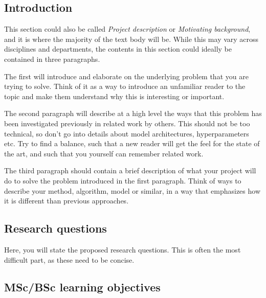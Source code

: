 \documentclass{article}
\begin{document}
\subsection{Introduction}
This section could also be called \emph{Project description} or \emph{Motivating background}, and it is where the majority of the text body will be.
While this may vary across disciplines and departments, the contents in this section could ideally be contained in three paragraphs.

The first will introduce and elaborate on the underlying problem that you are trying to solve.
Think of it as a way to introduce an unfamiliar reader to the topic and make them understand why this is interesting or important.

The second paragraph will describe at a high level the ways that this problem has been investigated previously in related work by others.
This should not be too technical, so don't go into details about model architectures, hyperparameters etc. 
Try to find a balance, such that a new reader will get the feel for the state of the art, and such that you yourself can remember related work.

The third paragraph should contain a brief description of what your project will do to solve the problem introduced in the first paragraph.
Think of ways to describe your method, algorithm, model or similar, in a way that emphasizes how it is different than previous approaches.


\subsection{Research questions}
Here, you will state the proposed research questions.
This is often the most difficult part, as these need to be concise.

\subsection{MSc/BSc learning objectives}
\end{document}
